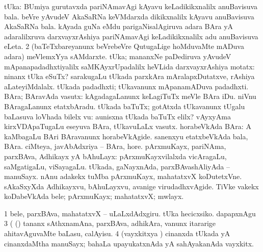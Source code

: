 \bentry
{} 
\gl{\nA}
\expl{}
\bmng
\bnum
{} tUka: 
\banum
{} BUmiya gurutavxda pariNAmavAgi kAyavu keLadikikxnalilx anuBavisuva bala. 
 beVre yAvudeV AkaSaRNa keVMdarxda dikikxnalilx kAyavu anuBavisuva AkaSaRNa bala. 
 kAyada guNa eMdu parigaNisalAgiruva adara BAra yA adaralilxruva darxvayxrAshiya pariNAmavAgi keLadikikxnalilx adu anuBavisuva eLeta. 
\eanum
\numie
\num{2} (baTeTxbareyanunx beVrebeVre QutugaLige hoMduvaMte mADuva adara) meVlemxYya sAMdarxte. 
\banum
{} tUka; mananxNe paDediruva yAvudeV mApanapadadhxtiyalilx saMKAyxrUpadalilx heVLida darxvayxrAshiya motatx:  ninanx tUka eSuTx?  sarakugaLu tUkada parxkAra mAralapxDutatxve, rAshiya aLateyiMdalalx. 
 tUkada padadhxti; tUkavanunx mApanamADuva padadhxti. 
 BAra; BAravAda vasutx:  kAgadagaLanunx keLagiTuTx meVle BAra iDu.  niVnu BAragaLanunx etatxbAradu. 
 tUkada baTuTx; gotAtxda tUkavanunx tUgalu baLasuva loVhada bilelx \mo vu:  aunisxna tUkada baTuTx elilx? 
 vAyxyAma kirxVDApaTugaLu eseyuva BAra, tUkavuLaLx vasutx. 
\eanum
\numie
{} 
\banum
{} horabeVkAda BAra:  A kaMbagaLu BAri BAravanunx horabeVkAgide. 
 sanenxyu etatxbeVkAda bala, BAra. 
 ciMteya, javAbAdxriya -- BAra, hore. 
\eanum
\numie
{} 
\banum
{} pArxmuKayx, pariNAma, parxBAva, Adhikayx yA bAhuLayx:  pArxmuKayxvilalxda vicAragaLu, saMgatigaLu, viSayagaLu.  tUkada, gaNayxnAda, parxBAvashAliyAda -- manuSayx.  nAnu adakekx tuMba pArxmuKayx, mahatatxvX koDutetxVne.  sAkaSxyXda Adhikayxvu, bAhuLayxvu, avanige virudadhxvAgide. 
 TiVke \mo vakekx koDabeVkAda bele; pArxmuKayx; mahatatxvX; mwlayx. 
\eanum
\numie
\enum
\emng

\noindent 
\gl{\pagu}
\expl{}
\bmng
\bnum
\num{1}  bele, parxBAva, mahatatxvX -- uLaLxdAdxgiru. 
  
\banum
{} tUka hecicxsiko. 
 dapapxnAgu 
\eanum
\numie
\num{3}  (  (\AmA) tananx sAthxnamAna, parxBAva, adhikAra, \mo vanunx itararige ahitavAguvaMte baLasu, calAyisu. 
\num{4}  (vayxkitxya \vi) cinanxda tUkada yA cinanxdaMtha manuSayx; bahaLa upayukatxnAda yA sahAyakanAda vayxkitx. 
\enum
\emng
\eentry

